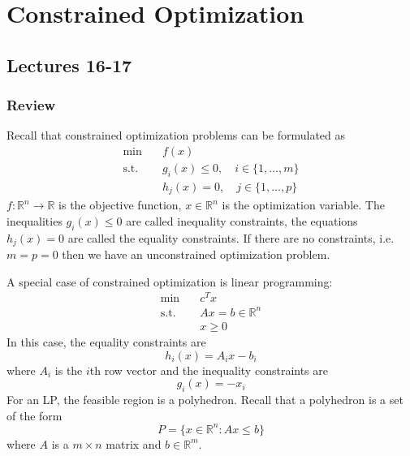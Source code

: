 \newpage
\section{Constrained Optimization}
\subsection{Lectures 16-17}
\subsubsection{Review}
Recall that constrained optimization problems can be formulated as 
\begin{align*}
    \min \quad & f(x) \\
    \text{s.t.} \quad &g_i(x) \leq 0, \quad i \in \{1,\ldots,m\} \\
    & h_j(x) = 0, \quad j \in \{1,\ldots,p\}
\end{align*}
$f: \mathbb R^n \to \mathbb R$ is the objective function, $x \in \mathbb R^n$ is the optimization variable. The inequalities $g_i(x) \leq 0$ are called inequality constraints, the equations $h_j(x) = 0$ are called the equality constraints. If there are no constraints, i.e. $m = p = 0$ then we have an unconstrained optimization problem.

\bigskip
A special case of constrained optimization is linear programming:
\begin{align*}
    \min \quad & c^T x \\
    \text{s.t.} \quad & Ax = b \in \mathbb R^n\\
    & x \geq 0
\end{align*}
In this case, the equality constraints are $$h_i(x) = A_i x - b_i$$ where $A_i$ is the $i$th row vector and the inequality constraints are $$g_i(x) = -x_i$$ For an LP, the feasible region is a polyhedron. Recall that a polyhedron is a set of the form
$$P = \{x \in \mathbb R^n: Ax \leq b\}$$ where $A$ is a $m \times n$ matrix and $b \in \mathbb R^m$.
